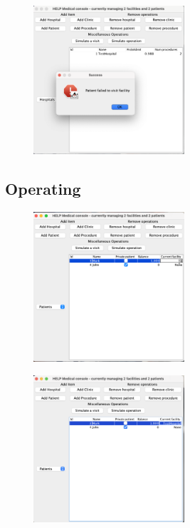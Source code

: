 \documentclass{article}
\begin{document}
\begin{figure}
  \begin{center}
    \includegraphics[width=0.5\textwidth]{./figures/Visit/Visit_3.png}
  \end{center}
\end{figure}

\subsection{Operating}\label{sub:operating} %
\begin{figure}
  \begin{center}
    \includegraphics[width=0.5\textwidth]{./figures/Operation/Operation_1.png}
  \end{center}
\end{figure}

\begin{figure}
  \begin{center}
    \includegraphics[width=0.5\textwidth]{./figures/Operation/Operation_2.png}
  \end{center}
\end{figure}
\end{document}
